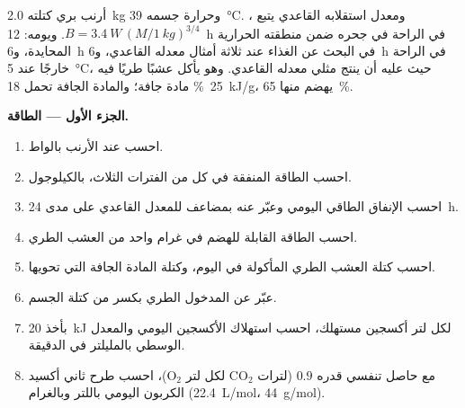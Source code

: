 \begin{problem}
\label{pb:b1:mammal-organization:1}
أرنب بري كتلته \qty{2.0}{kg} وحرارة جسمه \qty{39}{\celsius}. ومعدل
استقلابه القاعدي يتبع ،
$B = \qty{3.4}{W}\,(M/\qty{1}{kg})^{3/4}$. ويومه: \qty{12}{h} في
الراحة في جحره ضمن منطقته الحرارية المحايدة، و\qty{6}{h} في البحث عن
الغذاء عند ثلاثة أمثال معدله القاعدي، و\qty{6}{h} في الراحة خارجًا
عند \qty{5}{\celsius}، حيث عليه أن ينتج مثلي معدله القاعدي. وهو يأكل
عشبًا طريًا فيه \qty{25}{\%} مادة جافة؛ والمادة الجافة تحمل
\qty{18}{kJ/g}، يهضم منها \qty{65}{\%}.

\medskip
\noindent\textbf{الجزء الأول --- الطاقة.}
\begin{enumerate}
  \item احسب  عند الأرنب بالواط.
  \item احسب الطاقة المنفقة في كل من الفترات الثلاث، بالكيلوجول.
  \item احسب الإنفاق الطاقي اليومي وعبّر عنه بمضاعف للمعدل القاعدي
        على مدى \qty{24}{h}.
  \item احسب الطاقة القابلة للهضم في غرام واحد من العشب الطري.
  \item احسب كتلة العشب الطري المأكولة في اليوم، وكتلة المادة الجافة
        التي تحويها.
  \item عبّر عن المدخول الطري بكسر من كتلة الجسم.
  \item بأخذ \qty{20}{kJ} لكل لتر أكسجين مستهلك، احسب استهلاك
        الأكسجين اليومي والمعدل الوسطي بالمليلتر في الدقيقة.
  \item مع حاصل تنفسي قدره $0.9$ (لترات $\mathrm{CO_2}$ لكل لتر
        $\mathrm{O_2}$)، احسب طرح ثاني أكسيد الكربون اليومي باللتر
        وبالغرام (\qty{22.4}{L/mol}، \qty{44}{g/mol}).
\end{enumerate}


\end{problem}
